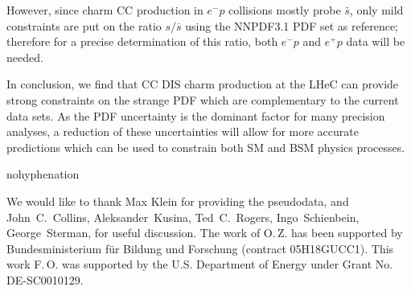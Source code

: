 \documentclass[pdftex,twocolumn,epjc3]{svjour3}          %
\newcommand\new[1]{{\color{blue} #1}}
\renewcommand\new[1]{{ #1}}
\begin{document}
\new{However, since charm CC production in $e^{-}p$ 
collisions mostly probe $\bar{s}$, only mild constraints are put on
the ratio $s/\overline{s}$ 
using the NNPDF3.1 PDF set as reference; therefore for a precise 
determination of this ratio, both $e^{-}p$ and $e^{+}p$ data will be needed.}





%
%
In conclusion, we find that CC DIS charm production at the LHeC can
provide strong constraints on the strange PDF which are complementary
to the current data sets.
%
As the PDF uncertainty is the dominant factor for many precision
analyses, a reduction of these uncertainties will allow for more
accurate predictions which can be used to constrain both SM and BSM
physics processes.




%
\begin{acknowledgements}
\begin{hyphenrules}{nohyphenation}
    
We would like to thank
Max Klein for providing the pseudodata, and 
John~C.~Collins,
Aleksander~Kusina,
Ted~C.~Rogers,
Ingo~Schienbein,
George~Sterman,
for useful discussion.
The work of O.\,Z. has been supported by Bundesministerium f\"ur Bildung und Forschung (contract 05H18GUCC1).
This work F.\,O. was supported by the U.S. Department of Energy under Grant No. DE-SC0010129.

%
%
%
%
%
%
%
%
%

\end{hyphenrules}
\end{acknowledgements}

%

%

%
%
%
%
% 
\printbibliography 
\end{document}
